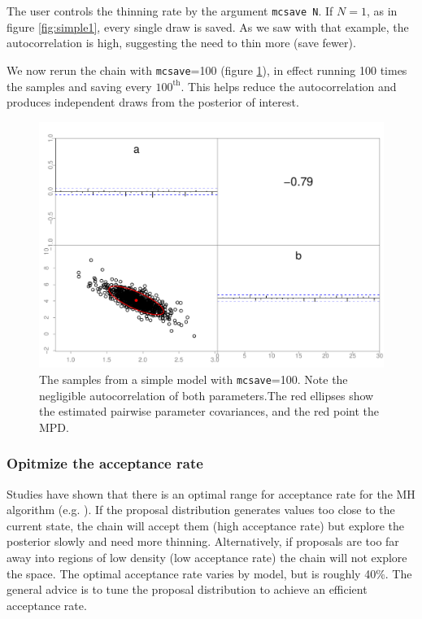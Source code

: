 \documentclass{article}\usepackage[]{graphicx}\usepackage[]{color}
\begin{document}
The user controls the thinning rate by the argument
\texttt{mcsave N}. If $N=1$, as in figure \ref{fig:simple1},
every single draw is saved. As we saw with that example, the
autocorrelation is high, suggesting the need to thin more
(save fewer).

We now rerun the chain with \texttt{mcsave}=100 (figure
\ref{fig:simple2}), in effect running 100 times the samples
and saving every $100^{\text{th}}$. This helps reduce the
autocorrelation and produces independent draws from the
posterior of interest.
\begin{figure}[h]
  \centering
  \includegraphics[width=5in]{../plots/simple2.pdf}
  \caption{The samples from a simple model with
    \texttt{mcsave}=100. Note the negligible autocorrelation
    of both parameters.The red ellipses show the estimated
    pairwise parameter covariances, and the red point the
    MPD.}
  \label{fig:simple2}
\end{figure}


\subsubsection{Opitmize the acceptance rate}
Studies have shown that there is an optimal range for
acceptance rate for the MH algorithm
(e.g. \cite{roberts2001}). If the proposal distribution
generates values too close to the current state, the chain
will accept them (high acceptance rate) but explore the
posterior slowly and need more thinning. Alternatively, if
proposals are too far away into regions of low density (low
acceptance rate) the chain will not explore the space. The
optimal acceptance rate varies by model, but is roughly
40\%. The general advice is to tune the proposal
distribution to achieve an efficient acceptance rate.
\end{document}
